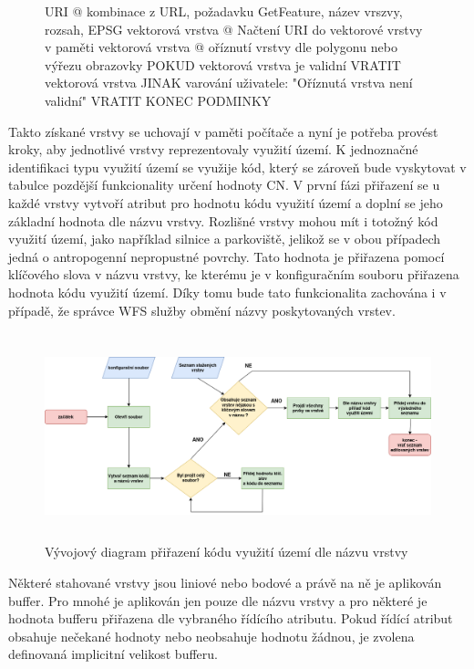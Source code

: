 \documentclass[a4paper,oneside,12pt]{book}
\begin{document}
\begin{figure}[H]
\begin{pseudocode}[style=mypseudocode, caption={Stažení vrstvy z WFS služby}, label={kod:wfs}]
URI @ kombinace z URL, požadavku GetFeature, název vrszvy, rozsah, EPSG
vektorová vrstva @ Načtení URI do vektorové vrstvy v paměti
vektorová vrstva @ oříznutí vrstvy dle polygonu nebo výřezu obrazovky
POKUD vektorová vrstva je validní
    VRATIT vektorová vrstva
JINAK
    varování uživatele: "Oříznutá vrstva není validní"
    VRATIT 
KONEC PODMINKY
\end{pseudocode}
\end{figure}

\hspace{10mm}Takto získané vrstvy se uchovají v paměti počítače a nyní je potřeba provést kroky, aby jednotlivé vrstvy reprezentovaly využití území. K jednoznačné identifikaci typu využití území se využije kód, který se zároveň bude vyskytovat v tabulce pozdější funkcionality určení hodnoty CN. V první fázi přiřazení se u každé vrstvy vytvoří atribut pro hodnotu kódu využití území a doplní se jeho základní hodnota dle názvu vrstvy. Rozlišné vrstvy mohou mít i totožný kód využití území, jako například silnice a parkoviště, jelikož se v obou případech jedná o antropogenní nepropustné povrchy. Tato hodnota je přiřazena pomocí klíčového slova v názvu vrstvy, ke kterému je v konfiguračním souboru přiřazena hodnota kódu využití území. Díky tomu bude tato funkcionalita zachována i v případě, že správce WFS služby obmění názvy poskytovaných vrstev.

\begin{figure}[H] \label{obr17}
\centering
\includegraphics[height=6cm]{pictures/LUcode_diagram.png}
\caption{Vývojový diagram přiřazení kódu využití území dle názvu vrstvy}
\label{fig:LU_diagram}
\end{figure}

\hspace{10mm}Některé stahované vrstvy jsou liniové nebo bodové a právě na ně je aplikován buffer. Pro mnohé je aplikován jen pouze dle názvu vrstvy a pro některé je hodnota bufferu přiřazena dle vybraného řídícího atributu. Pokud řídící atribut obsahuje nečekané hodnoty nebo neobsahuje hodnotu žádnou, je zvolena definovaná implicitní velikost bufferu.
\end{document}
